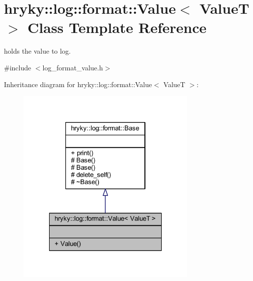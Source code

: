 \hypertarget{classhryky_1_1log_1_1format_1_1_value}{\section{hryky\-:\-:log\-:\-:format\-:\-:Value$<$ Value\-T $>$ Class Template Reference}
\label{classhryky_1_1log_1_1format_1_1_value}
}


holds the value to log.  




{\ttfamily \#include $<$log\-\_\-format\-\_\-value.\-h$>$}



Inheritance diagram for hryky\-:\-:log\-:\-:format\-:\-:Value$<$ Value\-T $>$\-:\nopagebreak
\begin{figure}[H]
\begin{center}
\leavevmode
\includegraphics[width=250pt]{classhryky_1_1log_1_1format_1_1_value__inherit__graph}
\end{center}
\end{figure}
